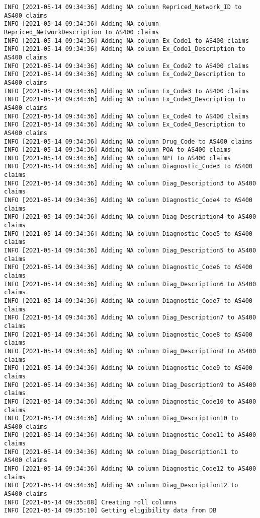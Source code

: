 \documentclass[
]{book}
\begin{document}
\begin{verbatim}
INFO [2021-05-14 09:34:36] Adding NA column Repriced_Network_ID to AS400 claims
INFO [2021-05-14 09:34:36] Adding NA column Repriced_NetworkDescription to AS400 claims
INFO [2021-05-14 09:34:36] Adding NA column Ex_Code1 to AS400 claims
INFO [2021-05-14 09:34:36] Adding NA column Ex_Code1_Description to AS400 claims
INFO [2021-05-14 09:34:36] Adding NA column Ex_Code2 to AS400 claims
INFO [2021-05-14 09:34:36] Adding NA column Ex_Code2_Description to AS400 claims
INFO [2021-05-14 09:34:36] Adding NA column Ex_Code3 to AS400 claims
INFO [2021-05-14 09:34:36] Adding NA column Ex_Code3_Description to AS400 claims
INFO [2021-05-14 09:34:36] Adding NA column Ex_Code4 to AS400 claims
INFO [2021-05-14 09:34:36] Adding NA column Ex_Code4_Description to AS400 claims
INFO [2021-05-14 09:34:36] Adding NA column Drug_Code to AS400 claims
INFO [2021-05-14 09:34:36] Adding NA column POA to AS400 claims
INFO [2021-05-14 09:34:36] Adding NA column NPI to AS400 claims
INFO [2021-05-14 09:34:36] Adding NA column Diagnostic_Code3 to AS400 claims
INFO [2021-05-14 09:34:36] Adding NA column Diag_Description3 to AS400 claims
INFO [2021-05-14 09:34:36] Adding NA column Diagnostic_Code4 to AS400 claims
INFO [2021-05-14 09:34:36] Adding NA column Diag_Description4 to AS400 claims
INFO [2021-05-14 09:34:36] Adding NA column Diagnostic_Code5 to AS400 claims
INFO [2021-05-14 09:34:36] Adding NA column Diag_Description5 to AS400 claims
INFO [2021-05-14 09:34:36] Adding NA column Diagnostic_Code6 to AS400 claims
INFO [2021-05-14 09:34:36] Adding NA column Diag_Description6 to AS400 claims
INFO [2021-05-14 09:34:36] Adding NA column Diagnostic_Code7 to AS400 claims
INFO [2021-05-14 09:34:36] Adding NA column Diag_Description7 to AS400 claims
INFO [2021-05-14 09:34:36] Adding NA column Diagnostic_Code8 to AS400 claims
INFO [2021-05-14 09:34:36] Adding NA column Diag_Description8 to AS400 claims
INFO [2021-05-14 09:34:36] Adding NA column Diagnostic_Code9 to AS400 claims
INFO [2021-05-14 09:34:36] Adding NA column Diag_Description9 to AS400 claims
INFO [2021-05-14 09:34:36] Adding NA column Diagnostic_Code10 to AS400 claims
INFO [2021-05-14 09:34:36] Adding NA column Diag_Description10 to AS400 claims
INFO [2021-05-14 09:34:36] Adding NA column Diagnostic_Code11 to AS400 claims
INFO [2021-05-14 09:34:36] Adding NA column Diag_Description11 to AS400 claims
INFO [2021-05-14 09:34:36] Adding NA column Diagnostic_Code12 to AS400 claims
INFO [2021-05-14 09:34:36] Adding NA column Diag_Description12 to AS400 claims
INFO [2021-05-14 09:35:08] Creating roll columns
INFO [2021-05-14 09:35:10] Getting eligibility data from DB

\end{verbatim}
\end{document}
